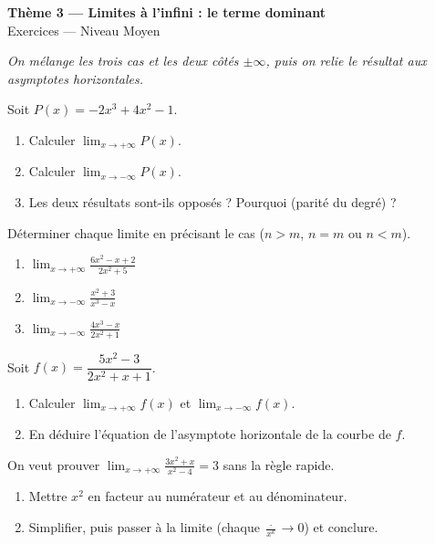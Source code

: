 \documentclass[11pt,a4paper]{article}
\begin{document}
\begin{center}
{\Large\bfseries\color{primarydark}Thème 3 — Limites à l'infini : le terme dominant}\\[2pt]
{\large\color{primary}Exercices — Niveau Moyen}
\end{center}
\vspace{4pt}
{\small\itshape On mélange les trois cas et les deux côtés $\pm\infty$, puis on relie le résultat aux
asymptotes horizontales.}
\vspace{6pt}

\begin{exercice}
Soit $P(x)=-2x^3+4x^2-1$.
\begin{enumerate}[label=\alph*),leftmargin=2em,itemsep=3pt]
  \item Calculer $\displaystyle\lim_{x\to+\infty} P(x)$.
  \item Calculer $\displaystyle\lim_{x\to-\infty} P(x)$.
  \item Les deux résultats sont-ils opposés ? Pourquoi (parité du degré) ?
\end{enumerate}
\end{exercice}

\begin{exercice}
Déterminer chaque limite en précisant le cas ($n>m$, $n=m$ ou $n<m$).
\begin{enumerate}[label=\alph*),leftmargin=2em,itemsep=3pt]
  \item $\displaystyle\lim_{x\to+\infty}\frac{6x^2-x+2}{2x^2+5}$
  \item $\displaystyle\lim_{x\to-\infty}\frac{x^2+3}{x^3-x}$
  \item $\displaystyle\lim_{x\to-\infty}\frac{4x^3-x}{2x^2+1}$
\end{enumerate}
\end{exercice}

\begin{exercice}
Soit $f(x)=\dfrac{5x^2-3}{2x^2+x+1}$.
\begin{enumerate}[label=\alph*),leftmargin=2em,itemsep=3pt]
  \item Calculer $\displaystyle\lim_{x\to+\infty} f(x)$ et $\displaystyle\lim_{x\to-\infty} f(x)$.
  \item En déduire l'équation de l'asymptote horizontale de la courbe de $f$.
\end{enumerate}
\end{exercice}

\begin{exercice}
On veut prouver $\displaystyle\lim_{x\to+\infty}\frac{3x^2+x}{x^2-4}=3$ sans la règle rapide.
\begin{enumerate}[label=\alph*),leftmargin=2em,itemsep=3pt]
  \item Mettre $x^2$ en facteur au numérateur et au dénominateur.
  \item Simplifier, puis passer à la limite (chaque $\frac{\cdot}{x^k}\to 0$) et conclure.
\end{enumerate}
\end{exercice}
\end{document}
